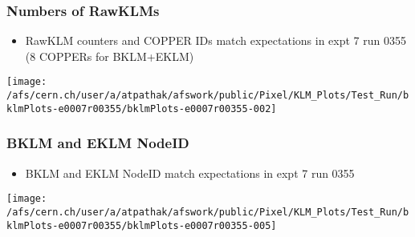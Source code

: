 \documentclass{beamer}
\begin{document}
\begin{frame}
\frametitle{Numbers of RawKLMs}
\vspace*{.05cm}

\begin{itemize} 
\item {\small RawKLM counters and COPPER IDs match expectations in expt 7 run 0355 (8 COPPERs for BKLM+EKLM)}
\end{itemize}

\begin{center}
\begin{normalsize}

\vspace*{-.2cm}
\begin{center}

\texttt{[image: /afs/cern.ch/user/a/atpathak/afswork/public/Pixel/KLM\_Plots/Test\_Run/bklmPlots-e0007r00355/bklmPlots-e0007r00355-002]}\\

\end{center}
\end{normalsize}
\end{center}
\end{frame}
\begin{frame}
\frametitle{BKLM and EKLM NodeID}
\vspace*{.05cm}

\begin{itemize} 
\item {\small BKLM and EKLM NodeID match expectations in expt 7 run 0355}
\end{itemize}

\begin{center}
\begin{normalsize}

\vspace*{-.2cm}
\begin{center}

\texttt{[image: /afs/cern.ch/user/a/atpathak/afswork/public/Pixel/KLM\_Plots/Test\_Run/bklmPlots-e0007r00355/bklmPlots-e0007r00355-005]}\\
\end{center}
\end{normalsize}
\end{center}
\end{frame}
\end{document}
